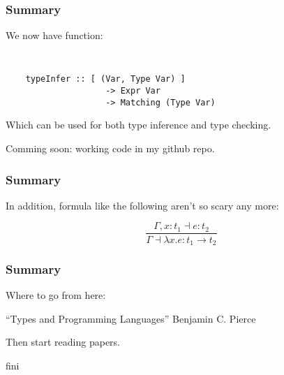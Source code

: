 \documentclass{beamer}
\begin{document}
\begin{frame}[fragile]
\frametitle{Summary}
\Large{
We now have  function:

{\tt
\begin{verbatim}
    typeInfer :: [ (Var, Type Var) ]
                    -> Expr Var
                    -> Matching (Type Var)
\end{verbatim}
}

Which can be used for both type inference and type checking.

\vspace{10pt}

Comming soon: working code in my github repo.
}
\end{frame}

\begin{frame}
\frametitle{Summary}
In addition, formula like the following aren't so scary any more:

{\Huge
$$\frac{\Gamma,x:t_1\dashv{}e:t_2}{\Gamma\dashv{}\lambda{}x.e:t_1\rightarrow{}t_2}$$
}
\end{frame}

\begin{frame}
\frametitle{Summary}
\begin{center}
Where to go from here:

\vspace{20pt}

``Types and Programming Languages''
Benjamin C. Pierce
 
\vspace{20pt}

Then start reading papers.
\end{center}
\end{frame}

\begin{frame}
\begin{center}
\Huge{
fini
}
\end{center}
\end{frame}
\end{document}
